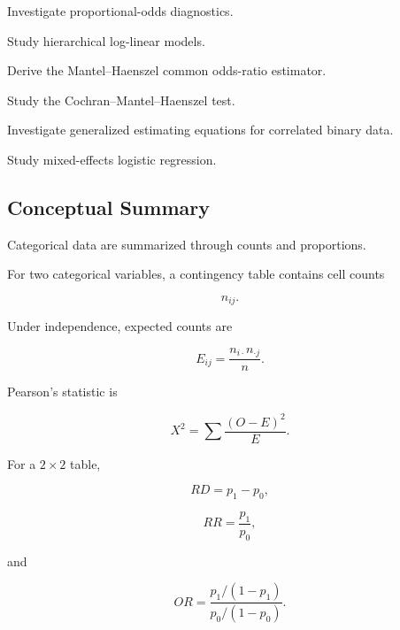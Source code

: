 \begin{exercise}[4]
Investigate proportional-odds diagnostics.
\end{exercise}

\begin{exercise}[4]
Study hierarchical log-linear models.
\end{exercise}

\begin{exercise}[4]
Derive the Mantel--Haenszel common odds-ratio estimator.
\end{exercise}

\begin{exercise}[4]
Study the Cochran--Mantel--Haenszel test.
\end{exercise}

\begin{exercise}[4]
Investigate generalized estimating equations for correlated binary data.
\end{exercise}

\begin{exercise}[4]
Study mixed-effects logistic regression.
\end{exercise}

\subsection{Conceptual Summary}
\label{subsec:categorical-summary}

Categorical data are summarized through counts and proportions.

For two categorical variables, a contingency table contains cell counts

\[
\boxed{
n_{ij}.
}
\]

Under independence, expected counts are

\[
\boxed{
E_{ij}
=
\frac{
n_{i\cdot}n_{\cdot j}
}{
n
}.
}
\]

Pearson's statistic is

\[
\boxed{
X^2
=
\sum
\frac{
(O-E)^2
}{
E
}.
}
\]

For a \(2\times2\) table,

\[
\boxed{
RD
=
p_1-p_0,
}
\]

\[
\boxed{
RR
=
\frac{
p_1
}{
p_0
},
}
\]

and

\[
\boxed{
OR
=
\frac{
p_1/(1-p_1)
}{
p_0/(1-p_0)
}.
}
\]


